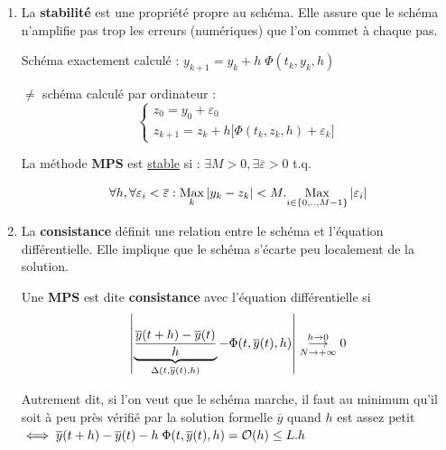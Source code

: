 \begin{enumerate}[label=$\to$]
    \item La \textbf{stabilité} est une propriété propre au schéma.
        Elle assure que le schéma n'amplifie pas trop les
        erreurs (numériques) que l'on commet à chaque pas.

        Schéma exactement calculé : $y_{k+1} = y_k + h \; \Phi (t_k,y_k,h)$ 
        
        $\ne$ schéma calculé par ordinateur :
        \begin{equation*}
            \left\lbrace
            \begin{array}{c}
                z_0 = y_0 + \varepsilon_0 \\
                z_{k+1} = z_k + h \big[ \Phi(t_k,z_k,h) + \varepsilon_k \big]
            \end{array}\right.
        \end{equation*}

        \begin{fdef}
            La méthode \textbf{MPS} est \underline{stable} si :
                $\exists M > 0, \exists \overline{\varepsilon} > 0$ t.q.

                \[
                    \forall h, \forall \varepsilon_i < \overline{\varepsilon} : \underset{k}{\operatorname{Max}} \left\lvert y_k-z_k\right\rvert < M . \underset{i \in \{0,..,M-1\}}{\operatorname{Max}} \left\lvert\varepsilon_i\right\rvert
                \]
        \end{fdef}

    \item La \textbf{consistance} définit une relation entre le schéma et l'équation
        différentielle. Elle implique que le schéma s'écarte peu localement de la
        solution.

        \begin{fdef}
            Une \textbf{MPS} est dite \textbf{consistance} avec l'équation différentielle si
            \[
                \left\lvert\underbrace{\frac{\overline{y}(t+h) - \overline{y}(t)}{h}}_{\Delta(t,\overline{y}(t),h)}
                - \Phi(t,\overline{y}(t),h)\right\rvert
                \overset{h\to0}{\underset{N\to+\infty}{\longrightarrow}} 0
            \]
            \label{eqdiff:def3}
        \end{fdef}

        Autrement dit, si l'on veut que le schéma marche, il faut au minimum qu'il soit
        à peu près vérifié par la solution formelle $\overline{y}$ quand $h$ est assez
        petit $\iff \overline{y}(t+h) - \overline{y}(t) - h \; \Phi (t,\overline{y}(t),h) = \mathcal{O}(h) \leq L.h$
\end{enumerate}

